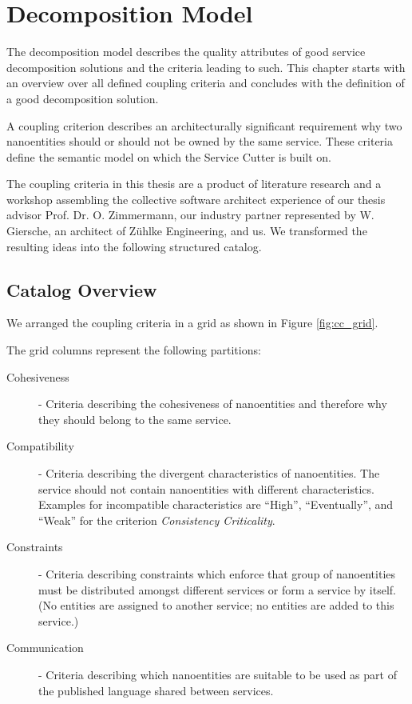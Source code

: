 \chapter{Decomposition Model}
\label{cha:decomposition}

The decomposition model describes the quality attributes of good service decomposition solutions and the criteria leading to such. This chapter starts with an overview over all defined coupling criteria and concludes with the definition of a good decomposition solution. 

A coupling criterion describes an architecturally significant requirement why two nanoentities should or should not be owned by the same service. These criteria define the semantic model on which the Service Cutter is built on. 

The coupling criteria in this thesis are a product of literature research and a workshop assembling the collective software architect experience of our thesis advisor Prof. Dr. O. Zimmermann, our industry partner represented by W. Giersche, an architect of Zühlke Engineering, and us. We transformed the resulting ideas into the following structured catalog.

\section{Catalog Overview}
\label{subsec:couplingCriteriaOverview}

We arranged the coupling criteria in a grid as shown in Figure \ref{fig:cc_grid}.

The grid columns represent the following partitions:

\begin{description}
	\item[Cohesiveness] - Criteria describing the cohesiveness of nanoentities and therefore why they should belong to the same service. 
	\item[Compatibility] - Criteria describing the divergent characteristics of nanoentities. The service should not contain nanoentities with different characteristics. Examples for incompatible characteristics are \enquote{High}, \enquote{Eventually}, and \enquote{Weak} for the criterion \textit{Consistency Criticality}.
	\item[Constraints] - Criteria describing constraints which enforce that group of nanoentities must be distributed amongst different services or form a service by itself. (No entities are assigned to another service; no entities are added to this service.)
	\item[Communication] - Criteria describing which nanoentities are suitable to be used as part of the published language shared between services. 
\end{description}

